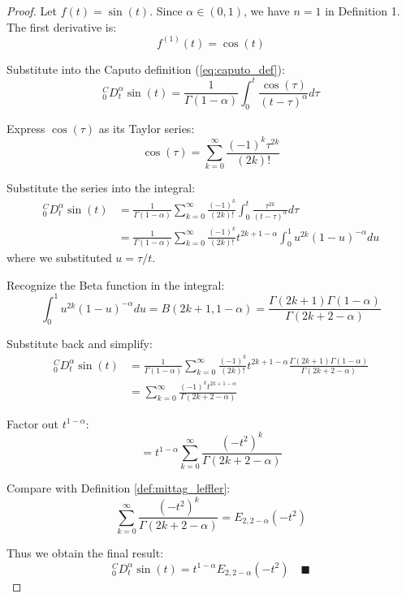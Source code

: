 \documentclass{article}
\begin{document}
\begin{proof}
Let $f(t) = \sin(t)$. Since $\alpha \in (0,1)$, we have $n=1$ in Definition 1. The first derivative is:
\begin{equation}
f^{(1)}(t) = \cos(t)
\end{equation}

Substitute into the Caputo definition (\ref{eq:caputo_def}):
\begin{equation}
_0^CD_t^\alpha \sin(t) = \frac{1}{\Gamma(1-\alpha)} \int_0^t \frac{\cos(\tau)}{(t-\tau)^\alpha} d\tau
\end{equation}

Express $\cos(\tau)$ as its Taylor series:
\begin{equation}
\cos(\tau) = \sum_{k=0}^{\infty} \frac{(-1)^k \tau^{2k}}{(2k)!}
\end{equation}

Substitute the series into the integral:
\begin{align}
_0^CD_t^\alpha \sin(t) &= \frac{1}{\Gamma(1-\alpha)} \sum_{k=0}^{\infty} \frac{(-1)^k}{(2k)!} \int_0^t \frac{\tau^{2k}}{(t-\tau)^\alpha} d\tau \\
&= \frac{1}{\Gamma(1-\alpha)} \sum_{k=0}^{\infty} \frac{(-1)^k}{(2k)!} t^{2k+1-\alpha} \int_0^1 u^{2k} (1-u)^{-\alpha} du
\end{align}
where we substituted $u = \tau/t$.

Recognize the Beta function in the integral:
\begin{equation}
\int_0^1 u^{2k} (1-u)^{-\alpha} du = B(2k+1, 1-\alpha) = \frac{\Gamma(2k+1)\Gamma(1-\alpha)}{\Gamma(2k+2-\alpha)}
\end{equation}

Substitute back and simplify:
\begin{align}
_0^CD_t^\alpha \sin(t) &= \frac{1}{\Gamma(1-\alpha)} \sum_{k=0}^{\infty} \frac{(-1)^k}{(2k)!} t^{2k+1-\alpha} \frac{\Gamma(2k+1)\Gamma(1-\alpha)}{\Gamma(2k+2-\alpha)} \\
&= \sum_{k=0}^{\infty} \frac{(-1)^k t^{2k+1-\alpha}}{\Gamma(2k+2-\alpha)}
\end{align}

Factor out $t^{1-\alpha}$:
\begin{equation}
= t^{1-\alpha} \sum_{k=0}^{\infty} \frac{(-t^2)^k}{\Gamma(2k + 2 - \alpha)}
\end{equation}

Compare with Definition \ref{def:mittag_leffler}:
\begin{equation}
\sum_{k=0}^{\infty} \frac{(-t^2)^k}{\Gamma(2k + 2 - \alpha)} = E_{2,2-\alpha}(-t^2)
\end{equation}

Thus we obtain the final result:
\begin{equation}
_0^CD_t^\alpha \sin(t) = t^{1-\alpha} E_{2,2-\alpha}(-t^2) \quad \blacksquare
\end{equation}
\end{proof}
\end{document}
